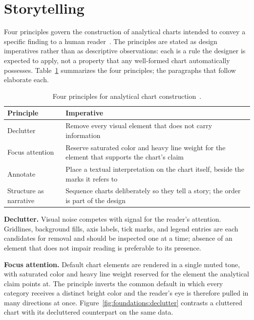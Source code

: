 \section{Storytelling}
\label{sec:foundations:storytelling}

Four principles govern the construction of analytical charts intended
to convey a specific finding to a human reader~\cite{knaflic2015}. The
principles are stated as design imperatives rather than as descriptive
observations: each is a rule the designer is expected to apply, not a
property that any well-formed chart automatically possesses.
Table~\ref{tab:foundations:knaflic} summarizes the four principles;
the paragraphs that follow elaborate each.

\begin{table}[!htbp]
\centering
\caption{Four principles for analytical chart construction~\cite{knaflic2015}.}
\label{tab:foundations:knaflic}
\footnotesize
\renewcommand{\arraystretch}{1.3}
\begin{tabularx}{\linewidth}{p{2.4cm} X}
\hline
\textbf{Principle} & \textbf{Imperative} \\
\hline
Declutter         & Remove every visual element that does not carry information \\
Focus attention   & Reserve saturated color and heavy line weight for the element that supports the chart's claim \\
Annotate          & Place a textual interpretation on the chart itself, beside the marks it refers to \\
Structure as narrative & Sequence charts deliberately so they tell a story; the order is part of the design \\
\hline
\end{tabularx}
\end{table}

\textbf{Declutter.} Visual noise competes with signal for the
reader's attention. Gridlines, background fills, axis labels, tick
marks, and legend entries are each candidates for removal and should
be inspected one at a time; absence of an element that does not
impair reading is preferable to its presence.

\textbf{Focus attention.} Default chart elements are rendered in a
single muted tone, with saturated color and heavy line weight
reserved for the element the analytical claim points at. The principle
inverts the common default in which every category receives a distinct
bright color and the reader's eye is therefore pulled in many
directions at once. Figure~\ref{fig:foundations:declutter} contrasts a
cluttered chart with its decluttered counterpart on the same data.

